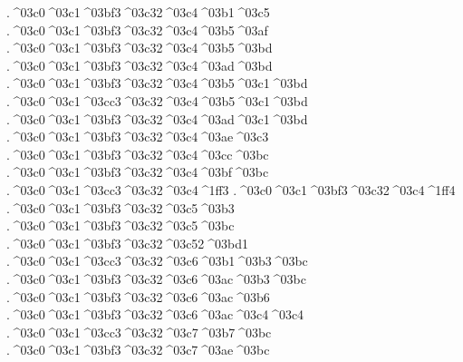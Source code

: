 {	.^^^^03c0^^^^03c1^^^^03bf3^^^^03c32^^^^03c4^^^^03b1^^^^03c5 		%
	.^^^^03c0^^^^03c1^^^^03bf3^^^^03c32^^^^03c4^^^^03b5^^^^03af 		%
	.^^^^03c0^^^^03c1^^^^03bf3^^^^03c32^^^^03c4^^^^03b5^^^^03bd 		%
	.^^^^03c0^^^^03c1^^^^03bf3^^^^03c32^^^^03c4^^^^03ad^^^^03bd 		%
	.^^^^03c0^^^^03c1^^^^03bf3^^^^03c32^^^^03c4^^^^03b5^^^^03c1^^^^03bd 		%
	.^^^^03c0^^^^03c1^^^^03cc3^^^^03c32^^^^03c4^^^^03b5^^^^03c1^^^^03bd 		%
	.^^^^03c0^^^^03c1^^^^03bf3^^^^03c32^^^^03c4^^^^03ad^^^^03c1^^^^03bd
	.^^^^03c0^^^^03c1^^^^03bf3^^^^03c32^^^^03c4^^^^03ae^^^^03c3 		%
	.^^^^03c0^^^^03c1^^^^03bf3^^^^03c32^^^^03c4^^^^03cc^^^^03bc 		%
	.^^^^03c0^^^^03c1^^^^03bf3^^^^03c32^^^^03c4^^^^03bf^^^^03bc
	.^^^^03c0^^^^03c1^^^^03cc3^^^^03c32^^^^03c4^^^^1ff3		%
	.^^^^03c0^^^^03c1^^^^03bf3^^^^03c32^^^^03c4^^^^1ff4
	.^^^^03c0^^^^03c1^^^^03bf3^^^^03c32^^^^03c5^^^^03b3 		%
	.^^^^03c0^^^^03c1^^^^03bf3^^^^03c32^^^^03c5^^^^03bc 		%
	.^^^^03c0^^^^03c1^^^^03bf3^^^^03c32^^^^03c52^^^^03bd1 		%
	.^^^^03c0^^^^03c1^^^^03cc3^^^^03c32^^^^03c6^^^^03b1^^^^03b3^^^^03bc 		%
	.^^^^03c0^^^^03c1^^^^03bf3^^^^03c32^^^^03c6^^^^03ac^^^^03b3^^^^03bc 
	.^^^^03c0^^^^03c1^^^^03bf3^^^^03c32^^^^03c6^^^^03ac^^^^03b6 		%
	.^^^^03c0^^^^03c1^^^^03bf3^^^^03c32^^^^03c6^^^^03ac^^^^03c4^^^^03c4 		%
	.^^^^03c0^^^^03c1^^^^03cc3^^^^03c32^^^^03c7^^^^03b7^^^^03bc 		%
	.^^^^03c0^^^^03c1^^^^03bf3^^^^03c32^^^^03c7^^^^03ae^^^^03bc
}
